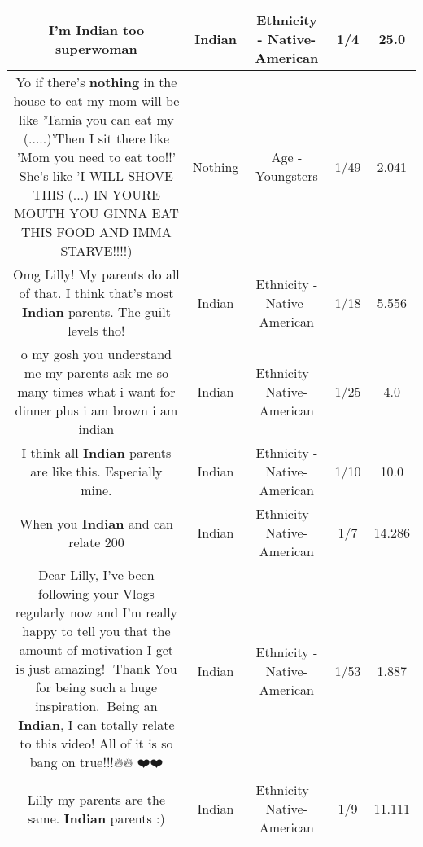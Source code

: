\documentclass[11pt]{article}
\newlength\mylength
\begin{document}
\begin{center}
\begin{longtable}{|C{.65\mylength}|C{.30\mylength}|C{.12\mylength}|C{.12\mylength}|C{.12\mylength}|}
  \small I'm \textbf{Indian} too superwoman\normalsize   & Indian & Ethnicity - Native-American & 1/4 & 25.0 \\  \hline
  \small Yo if there's \textbf{nothing} in the house to eat my mom will be like 'Tamia you can eat my (.....)'Then I sit there like 'Mom you need to eat too!!' She's like 'I WILL SHOVE THIS (...) IN YOURE MOUTH YOU GINNA EAT THIS FOOD AND IMMA STARVE!!!!)\normalsize   & Nothing & Age - Youngsters & 1/49 & 2.041 \\  \hline
  \small Omg Lilly! My parents do all of that. I think that's most \textbf{Indian} parents. The guilt levels tho!\normalsize   & Indian & Ethnicity - Native-American & 1/18 & 5.556 \\  \hline
  \small o my gosh you understand me my  parents ask me so many times what i want for dinner plus i am brown i am indian\normalsize   & Indian & Ethnicity - Native-American & 1/25 & 4.0 \\  \hline
  \small I think all \textbf{Indian} parents are like this. Especially mine.\normalsize   & Indian & Ethnicity - Native-American & 1/10 & 10.0 \\  \hline
  \small When you \textbf{Indian} and can relate 200\normalsize   & Indian & Ethnicity - Native-American & 1/7 & 14.286 \\  \hline
  \small Dear Lilly, I've been following your Vlogs regularly now and I'm really happy to tell you that the amount of motivation I get is just amazing! 😬Thank You for being such a huge inspiration.💯💕Being an \textbf{Indian}, I can totally relate to this video! All of it is so bang on true!!!🔥🔥 ❤️❤️\normalsize   & Indian & Ethnicity - Native-American & 1/53 & 1.887 \\  \hline
  \small Lilly my parents are the same. \textbf{Indian} parents :)\normalsize   & Indian & Ethnicity - Native-American & 1/9 & 11.111 \\  \hline

\end{longtable}
\end{center}
\end{document}
